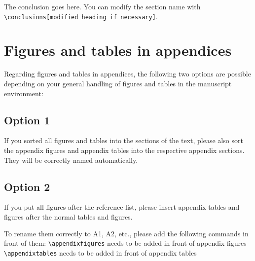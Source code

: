 \documentclass[gmd, manuscript]{copernicus}
\begin{document}
\conclusions[Conclusions]

The conclusion goes here. You can modify the section name with
\texttt{\textbackslash{}conclusions{[}modified\ heading\ if\ necessary{]}}.







\appendix
\section{Figures and tables in appendices}

Regarding figures and tables in appendices, the following two options
are possible depending on your general handling of figures and tables in
the manuscript environment:

\subsection{Option 1}

If you sorted all figures and tables into the sections of the text,
please also sort the appendix figures and appendix tables into the
respective appendix sections. They will be correctly named
automatically.

\subsection{Option 2}

If you put all figures after the reference list, please insert appendix
tables and figures after the normal tables and figures.

To rename them correctly to A1, A2, etc., please add the following
commands in front of them: \texttt{\textbackslash{}appendixfigures}
needs to be added in front of appendix figures
\texttt{\textbackslash{}appendixtables} needs to be added in front of
appendix tables
\end{document}
